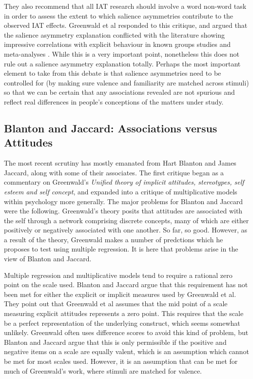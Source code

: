They also recommend that all IAT research should involve a word non-word task in order to assess the extent to which salience asymmetries contribute to the observed IAT effects. Greenwald  et al \cite{Greenwald2005} responded to this critique, and argued that the salience asymmetry explanation conflicted with the literature showing impressive correlations with explicit behaviour in known groups studies and meta-analyses \cite{Greenwald2009}. While this is a very important point, nonetheless this does not rule out a salience asymmetry explanation totally. Perhaps the most important element to take from this debate is that salience asymmetries need to be controlled for (by making sure valence and familiarity are matched across stimuli) so that we can be certain that any associations revealed are not spurious and reflect real differences in people's conceptions of the matters under study. 

\subsection{Blanton and Jaccard: Associations versus Attitudes}


The most recent scrutiny has mostly emanated from Hart Blanton and James Jaccard, along with some of their associates. The first critique began as a commentary on Greenwald's \cite{Greenwald2002}  \textit{Unified theory of implicit attitudes, stereotypes, self esteem and self concept}, and expanded into a critique of multiplicative models within psychology more generally. The major problems for Blanton and Jaccard \cite{Blanton2006a} were the following. Greenwald's theory posits that attitudes are associated with the self through a network comprising discrete concepts, many of which are either positively or negatively associated with one another. So far, so good. However, as a result of the theory, Greenwald makes a number of predctions which he proposes to test using multiple regression. It is here that problems arise in the view of Blanton and Jaccard. 

Multiple regression and multiplicative models tend to require a rational zero point on the scale used. Blanton and Jaccard argue that this requirement has not been met for either the explicit or implicit measures used by Greenwald et al. They point out that Greenwald et al \cite{Greenwald2002} assumes that the mid point of a scale measuring explicit attitudes represents a zero point. This requires that the scale be a perfect representation of the underlying construct, which seems somewhat unlikely. Greenwald often uses difference scores to avoid this kind of problem, but Blanton and Jaccard argue that this is only permissible if the positive and negative items on a scale are equally valent, which is an assumption which cannot be met for most scales used. However, it is an assumption that can be met for much of Greenwald's work, where stimuli are matched for valence. 

